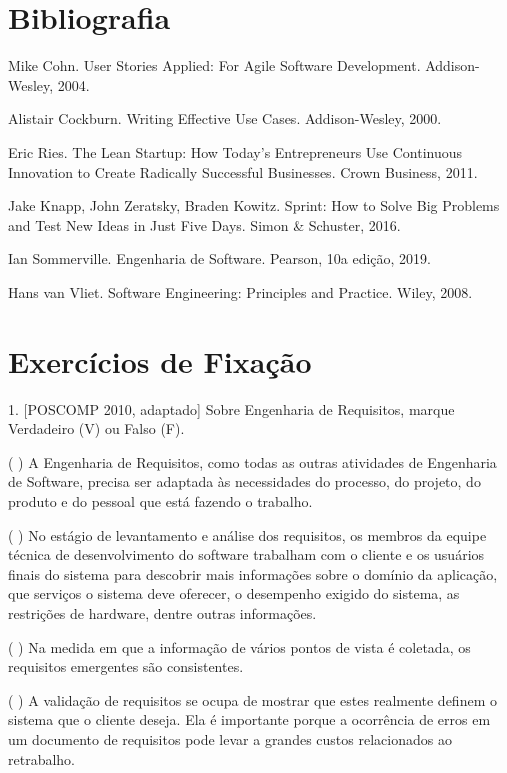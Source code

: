 \documentclass[
  11pt,
  twoside]{book}
\begin{document}
\hypertarget{bibliografia-2}{%
\section*{Bibliografia}\label{bibliografia-2}}

Mike Cohn. User Stories Applied: For Agile Software Development.
Addison-Wesley, 2004.

Alistair Cockburn. Writing Effective Use Cases. Addison-Wesley, 2000.

Eric Ries. The Lean Startup: How Today's Entrepreneurs Use Continuous
Innovation to Create Radically Successful Businesses. Crown Business,
2011.

Jake Knapp, John Zeratsky, Braden Kowitz. Sprint: How to Solve Big
Problems and Test New Ideas in Just Five Days. Simon \& Schuster, 2016.

Ian Sommerville. Engenharia de Software. Pearson, 10a edição, 2019.

Hans van Vliet. Software Engineering: Principles and Practice. Wiley,
2008.

\hypertarget{exercuxedcios-de-fixauxe7uxe3o-2}{%
\section*{Exercícios de
Fixação}\label{exercuxedcios-de-fixauxe7uxe3o-2}}

1. {[}POSCOMP 2010, adaptado{]} Sobre Engenharia de Requisitos, marque
Verdadeiro (V) ou Falso (F).

( ) A Engenharia de Requisitos, como todas as outras atividades de
Engenharia de Software, precisa ser adaptada às necessidades do
processo, do projeto, do produto e do pessoal que está fazendo o
trabalho.

( ) No estágio de levantamento e análise dos requisitos, os membros da
equipe técnica de desenvolvimento do software trabalham com o cliente e
os usuários finais do sistema para descobrir mais informações sobre o
domínio da aplicação, que serviços o sistema deve oferecer, o desempenho
exigido do sistema, as restrições de hardware, dentre outras
informações.

( ) Na medida em que a informação de vários pontos de vista é coletada,
os requisitos emergentes são consistentes.

( ) A validação de requisitos se ocupa de mostrar que estes realmente
definem o sistema que o cliente deseja. Ela é importante porque a
ocorrência de erros em um documento de requisitos pode levar a grandes
custos relacionados ao retrabalho.
\end{document}
